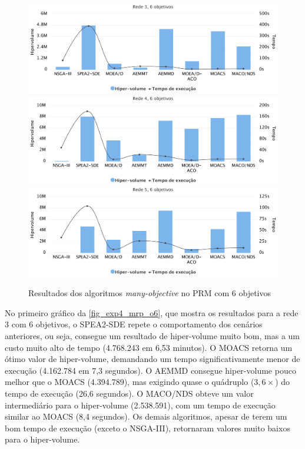 \begin{figure}[!htbp]	
	\includegraphics[width=1\textwidth]{cap_experimentos/figs/etapa4/r3o6}
	\includegraphics[width=1\textwidth]{cap_experimentos/figs/etapa4/r4o6}
	\includegraphics[width=1\textwidth]{cap_experimentos/figs/etapa4/r5o6}
	\caption{\label{fig_exp4_mrp_o6}Resultados dos algoritmos \textit{many-objective} no PRM com 6 objetivos}
\end{figure}

No primeiro gráfico da \autoref{fig_exp4_mrp_o6}, que mostra os resultados para a rede 3 com 6 objetivos, o SPEA2-SDE repete o comportamento dos cenários anteriores, ou seja, consegue um resultado de hiper-volume muito bom, mas a um custo muito alto de tempo (4.768.243 em 6,53 minutos). O MOACS retorna um ótimo valor de hiper-volume, demandando um tempo significativamente menor de execução (4.162.784 em 7,3 segundos). O AEMMD consegue hiper-volume pouco melhor que o MOACS (4.394.789), mas exigindo quase o quádruplo ($3,6\times$) do tempo de execução (26,6 segundos). O MACO/NDS obteve um valor intermediário para o hiper-volume (2.538.591), com um tempo de execução similar ao MOACS (8,4 segundos). Os demais algoritmos, apesar de terem um bom tempo de execução (exceto o NSGA-III), retornaram valores muito baixos para o hiper-volume. 

